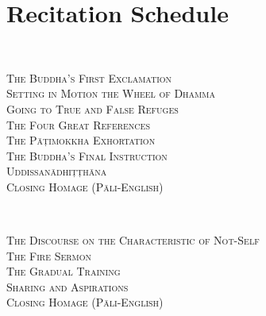 \chapter{Recitation Schedule}

\label{schedule}

{\centering

  {\libertinusFont\selectfont\textbf{\textsc{\fontsize{18}{12}\selectfont{}}}}\\

  \textsc{\fontsize{16}{28}\selectfont
    The Buddha's First Exclamation \pageref{buddhas-first-exclamation}\\
    Setting in Motion the Wheel of Dhamma \pageref{wheel-of-dhamma-abridged}\\
    Going to True and False Refuges \pageref{true-false-refuges}\\
    The Four Great References \pageref{four-great-references}\\
    The Pāṭimokkha Exhortation \pageref{patimokkha-exhortation}\\
    The Buddha's Final Instruction \pageref{buddhas-final-instruction}\\
    Uddissanādhiṭṭhāna \pageref{uddissanadhitthana}\\
    Closing Homage (Pāli-English) \pageref{closing-homage}\\
  }

  \vspace{1.5cm}

  {\libertinusFont\selectfont\textbf{\textsc{\fontsize{18}{12}\selectfont{}}}}\\

  \textsc{\fontsize{16}{28}\selectfont
    The Discourse on the Characteristic of Not-Self \pageref{characteristic-of-not-self}\\
    The Fire Sermon \pageref{fire-sermon}\\
    The Gradual Training \pageref{gradual-training}\\
    Sharing and Aspirations \pageref{sharing-aspirations}\\
    Closing Homage (Pāli-English) \pageref{closing-homage}\\
  }

  \clearpage

  {\libertinusFont\selectfont\textbf{\textsc{\fontsize{18}{12}\selectfont{}}}}\\

}

